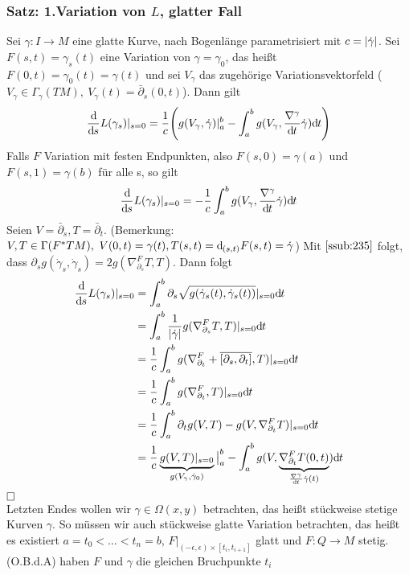 \subsubsection{Satz: 1.Variation von $L$, glatter Fall}
\label{ssub:236}
Sei $\gamma:I\to M$ eine glatte Kurve, nach Bogenlänge parametrisiert mit $c=\lvert\dot{\gamma}\rvert$. Sei $F(s,t) = \gamma_s(t)$ eine Variation von $\gamma = \gamma_0$, das heißt $F(0,t) = \gamma_0(t) = \gamma(t)$ und sei $V_\gamma$ das zugehörige Variationsvektorfeld ($V_\gamma \in \Gamma_\gamma(TM),\ V_\gamma (t) = \bar{\partial}_s (0,t)$).
Dann gilt
\[
\frac{\mathd}{\mathd s} L(\gamma_s)\vert_{s=0} = \frac{1}{c}\enbrace*{g(V_\gamma,\dot{\gamma})\vert_a^b - \int_a^b g(V_\gamma,\frac{\nabla^\gamma}{\mathd t}\dot{\gamma})\mathd t}
\]
Falls $F$ Variation mit festen Endpunkten, also $F(s,0) = \gamma(a)$ und $F(s,1) = \gamma(b)$ für alle s, so gilt
\[
\frac{\mathrm{d}\mkern-1.0mu}{\mathrm{d}\mkern-1.0mu s} L(\gamma_s)\vert_{s=0} = - \frac{1}{c} \int_a^b g(V_\gamma,\frac{\nabla^\gamma}{\mathrm{d}\mkern-1.0mu t}\dot{\gamma})\mathrm{d}\mkern-1.0mu t
\]
Seien $V = \bar{\partial}_s, T = \bar{\partial}_t$. (Bemerkung: $V,T \in \Gamma(F^* TM),\ V(0,t) = \gamma(t), T(s,t) = \mathrm{d}\mkern-1.0mu_{(s,t)} F(s,t) = \dot{\gamma}$) Mit $\ref{ssub:235}$ folgt, dass $\partial_s g(\dot{\gamma}_s,\dot{\gamma}_s) = 2g(\nabla_{\partial_s}^F T,T)$. Dann folgt
\begin{align*}
\frac{\mathd}{\mathd s} L(\gamma_s)\vert_{s=0} &  = \int_a^b \partial_s \sqrt{g\enbrace*{\dot{\gamma}_s (t),\dot{\gamma}_s (t)}}\vert_{s=0} \mathd t\\
& = \int_a^b \frac{1}{\abs{\dot{\gamma}}} g(\nabla_{\partial_s}^F T,T)\vert_{s=0} \mathd t\\
& = \frac{1}{c} \int_a^b g(\nabla_{\partial_t}^F + \overline{\benbrace{\partial_s,\partial_t}},T)\vert_{s=0}\mathd t\\
& = \frac{1}{c} \int_a^b g(\nabla_{\partial_t}^F,T)\vert_{s=0}\mathd t\\
& = \frac{1}{c} \int_a^b \partial_t g(V,T) - g(V,\nabla_{\partial_t}^F T)\vert_{s=0} \mathd t\\
& = \frac{1}{c} \underbrace{g(V,T)\vert_{s=0}}_{g(V_\gamma,\dot{\gamma}_0)}\big\vert_a^b - \int_a^b g(V,\underbrace{\nabla_{\partial_t}^F T(0,t)}_{\frac{\nabla^\gamma}{\mathd t} \dot{\gamma}(t)}) \mathd t
\end{align*}
$\hfill \square$
\\
Letzten Endes wollen wir $\gamma \in \Omega(x,y)$ betrachten, das heißt stückweise stetige Kurven $\gamma$. So müssen wir auch stückweise glatte Variation betrachten, das heißt es existiert $a=t_0 < \ldots < t_n = b$, $F\vert_{(-\epsilon,\epsilon)\times [t_i,t_{i+1}]}$ glatt und $F:Q\to M$ stetig. (O.B.d.A) haben $F$ und $\gamma$ die gleichen Bruchpunkte $t_i$

